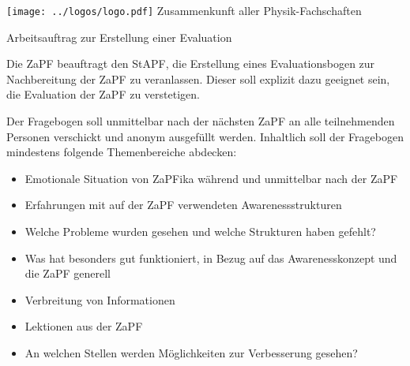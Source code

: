 \documentclass[DIV=calc]{scrartcl}
\begin{document}
	
	\hspace{0.87\textwidth}
	\begin{minipage}{120pt}
		\vspace{-1.8cm}
		\texttt{[image: ../logos/logo.pdf]}
		\centering
		\small Zusammenkunft aller Physik-Fachschaften
	\end{minipage}
	
	\begin{center}
		\huge{Arbeitsauftrag zur Erstellung einer Evaluation}\vspace{.25\baselineskip}\\
		\normalsize
	\end{center}
	\vspace{1cm}
	
	
	
	
	
	
	
	Die ZaPF beauftragt den StAPF, die Erstellung eines Evaluationsbogen zur Nachbereitung der ZaPF zu veranlassen. Dieser soll explizit dazu geeignet sein, die Evaluation der ZaPF zu verstetigen.
	
	Der Fragebogen soll unmittelbar nach der nächsten ZaPF an alle teilnehmenden Personen verschickt und anonym ausgefüllt werden. Inhaltlich soll der Fragebogen mindestens folgende Themenbereiche abdecken:
	
	\begin{itemize}
		\item Emotionale Situation von ZaPFika während und unmittelbar nach der ZaPF
		\item Erfahrungen mit auf der ZaPF verwendeten Awarenessstrukturen
		\item Welche Probleme wurden gesehen und welche Strukturen haben gefehlt?
		\item Was hat besonders gut funktioniert, in Bezug auf das Awarenesskonzept und die ZaPF generell
		\item Verbreitung von Informationen
		\item Lektionen aus der ZaPF
		\item An welchen Stellen werden Möglichkeiten zur Verbesserung gesehen?
	\end{itemize}
	
\end{document}
